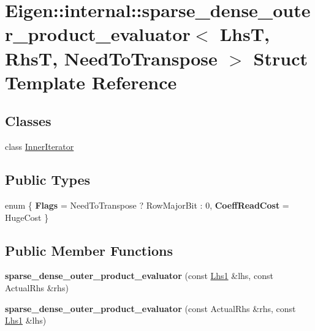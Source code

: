 \hypertarget{struct_eigen_1_1internal_1_1sparse__dense__outer__product__evaluator}{}\section{Eigen\+::internal\+::sparse\+\_\+dense\+\_\+outer\+\_\+product\+\_\+evaluator$<$ LhsT, RhsT, Need\+To\+Transpose $>$ Struct Template Reference}
\label{struct_eigen_1_1internal_1_1sparse__dense__outer__product__evaluator}
\subsection*{Classes}
\begin{DoxyCompactItemize}
\item 
class \mbox{\hyperlink{class_eigen_1_1internal_1_1sparse__dense__outer__product__evaluator_1_1_inner_iterator}{Inner\+Iterator}}
\end{DoxyCompactItemize}
\subsection*{Public Types}
\begin{DoxyCompactItemize}
\item 
\mbox{\label{struct_eigen_1_1internal_1_1sparse__dense__outer__product__evaluator_a58ba260f45ce29365fe3c92c7c9eaf8a}} 
enum \{ {\bfseries Flags} = Need\+To\+Transpose ? Row\+Major\+Bit \+: 0, 
{\bfseries Coeff\+Read\+Cost} = Huge\+Cost
 \}
\end{DoxyCompactItemize}
\subsection*{Public Member Functions}
\begin{DoxyCompactItemize}
\item 
\mbox{\label{struct_eigen_1_1internal_1_1sparse__dense__outer__product__evaluator_a56283b61a79ec466676cf293a9dbabd5}} 
{\bfseries sparse\+\_\+dense\+\_\+outer\+\_\+product\+\_\+evaluator} (const \mbox{\hyperlink{struct_eigen_1_1internal_1_1true__type}{Lhs1}} \&lhs, const Actual\+Rhs \&rhs)
\item 
\mbox{\label{struct_eigen_1_1internal_1_1sparse__dense__outer__product__evaluator_a5efbe051be702e03c39efe9df66424d1}} 
{\bfseries sparse\+\_\+dense\+\_\+outer\+\_\+product\+\_\+evaluator} (const Actual\+Rhs \&rhs, const \mbox{\hyperlink{struct_eigen_1_1internal_1_1true__type}{Lhs1}} \&lhs)
\end{DoxyCompactItemize}
